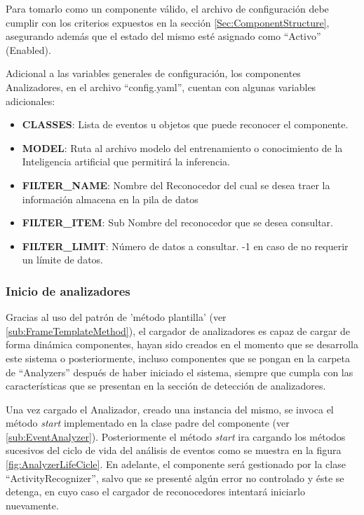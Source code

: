             Para tomarlo como un componente válido, el archivo de configuración debe cumplir con los criterios expuestos en la sección \ref{Sec:ComponentStructure}, asegurando además que el estado del mismo esté asignado como ``Activo'' (Enabled). 
            
            Adicional a las variables generales de configuración, los componentes Analizadores, en el archivo ``config.yaml'', cuentan con algunas variables adicionales: 
            
            \begin{itemize}
                \item \textbf{CLASSES}: Lista de eventos u objetos que puede reconocer el componente.
                \item \textbf{MODEL}: Ruta al archivo modelo del entrenamiento o conocimiento de la Inteligencia artificial  que permitirá la inferencia.
                \item \textbf{FILTER\_NAME}: Nombre del Reconocedor del cual se desea traer la información almacena en la pila de datos
                \item \textbf{FILTER\_ITEM}: Sub Nombre del reconocedor que se desea consultar.
                \item \textbf{FILTER\_LIMIT}: Número de datos a consultar. -1 en caso de no requerir un límite de datos.
            \end{itemize}
        
        \subsubsection{Inicio de analizadores}
        \label{sub2:AnalyzerStarting}
            Gracias al uso del patrón de 'método plantilla' (ver \ref{sub:FrameTemplateMethod}), el cargador de analizadores es capaz de cargar de forma dinámica componentes, hayan sido creados en el momento que se desarrolla este sistema o posteriormente, incluso componentes que se pongan en la carpeta de ``Analyzers'' después de haber iniciado el sistema, siempre que cumpla con las características que se presentan en la sección de detección de analizadores.
            
            Una vez cargado el Analizador, creado una instancia del mismo, se invoca el método \textit{start} implementado en la clase padre del componente (ver \ref{sub:EventAnalyzer}). Posteriormente el método \textit{start} ira cargando los métodos sucesivos del ciclo de vida del análisis de eventos como se muestra en la figura \ref{fig:AnalyzerLifeCicle}. En adelante, el componente será gestionado por la clase ``ActivityRecognizer'', salvo que se presenté algún error no controlado y éste se detenga, en cuyo caso el cargador de reconocedores intentará iniciarlo nuevamente.
        
